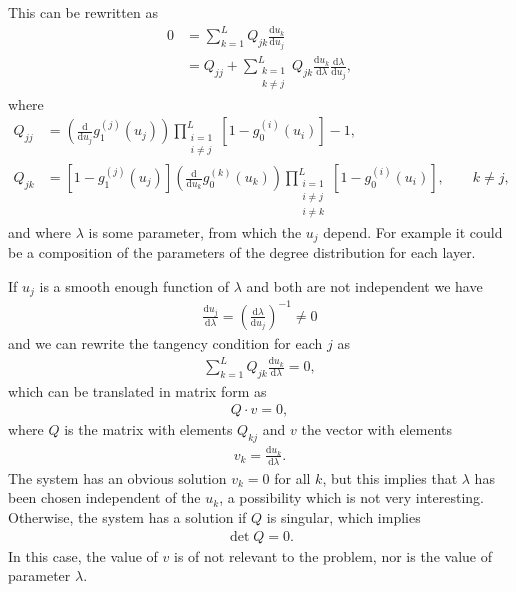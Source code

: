 \documentclass[
11pt, %
english, %
singlespacing, %
liststotoc, %
headsepline, %
]{MastersDoctoralThesis} %
\newcommand{\total}{\text{d}}
\begin{document}
This can be rewritten as
\begin{align}
	0 &= \sum_{k = 1}^L Q_{jk} \frac{\total u_k}{\total u_j} \\
	&= Q_{jj} + \sum_{\substack{k = 1\\k \neq j}}^L Q_{jk} \frac{\total u_k}{\total \lambda} \frac{\total \lambda}{\total u_j},
\end{align}
where
\begin{align}
	Q_{jj} &= \left(\frac{\total}{\total u_j} g_1^{(j)}(u_j)\right) \prod_{\substack{i = 1 \\ i \neq j}}^{L}  \left[1 - g_0^{(i)}(u_i) \right] - 1, \\
	Q_{jk} &= \left[1 - g_1^{(j)}(u_j) \right] \left(\frac{\total}{\total u_k} g_0^{(k)}(u_k)\right)\prod_{\substack{i = 1 \\ i \neq j\\ i \neq k}}^{L}  \left[1 - g_0^{(i)}(u_i) \right], \qquad k \neq j,
\end{align}
and where $\lambda$ is some parameter, from which the $u_j$ depend. For example it could be a composition of the parameters of the degree distribution for each layer.

If $u_j$ is a smooth enough function of $\lambda$ and both are not independent we have
\begin{align}
	\frac{\total u_j}{\total \lambda} = \left( \frac{\total \lambda}{\total u_j} \right)^{-1} \neq 0
\end{align}
and we can rewrite the tangency condition for each $j$ as
\begin{align}
	\sum_{k=1}^L Q_{jk} \frac{\total u_k}{\total \lambda} = 0,
\end{align}
which can be translated in matrix form as
\begin{align}
	Q \cdot v = 0,
\end{align}
where $Q$ is the matrix with elements $Q_{kj}$ and $v$ the vector with elements
\begin{align}
	v_k = \frac{\total u_k}{\total \lambda}.
\end{align}
The system has an obvious solution $v_k = 0$ for all $k$, but this implies that $\lambda$ has been chosen independent of the $u_k$, a possibility which is not very interesting. Otherwise, the system has a solution if $Q$ is singular, which implies
\begin{align}
	\det{Q} = 0. \label{Tangency condition as determinant}
\end{align}
In this case, the value of $v$ is of not relevant to the problem, nor is the value of parameter $\lambda$.
\end{document}
